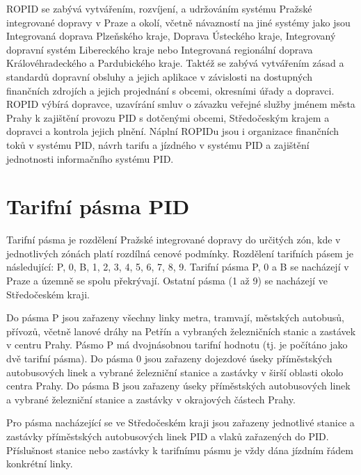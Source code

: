 ROPID se zabývá vytvářením, rozvíjení, a udržováním systému Pražské integrované dopravy v Praze a okolí,
včetně návazností na jiné systémy jako jsou Integrovaná doprava Plzeňského kraje,
Doprava Ústeckého kraje, Integrovaný dopravní systém Libereckého kraje nebo 
Integrovaná regionální doprava Královéhradeckého a Pardubického kraje.
Taktéž se zabývá vytvářením zásad a standardů dopravní obsluhy a jejich aplikace v závislosti
na dostupných finančních zdrojích a jejich projednání s obcemi, okresními úřady a dopravci.
ROPID výbírá dopravce, uzavírání smluv o závazku veřejné služby jménem města Prahy 
k zajištění provozu PID s dotčenými obcemi, Středočeským krajem a dopravci a kontrola jejich plnění.
Náplní ROPIDu jsou i organizace finančních toků v systému PID, návrh tarifu a jízdného v systému PID a
zajištění jednotnosti informačního systému PID.  \cite{wikipedia-ropid}

\section{Tarifní pásma PID}

Tarifní pásma je rozdělení Pražské integrované dopravy do určitých zón, kde v jednotlivých
zónách platí rozdílná cenové podmínky. Rozdělení tarifních pásem je následující:
P, 0, B, 1, 2, 3, 4, 5, 6, 7, 8, 9. Tarifní pásma P, 0 a B se nacházejí v Praze a územně
se spolu překrývají. Ostatní pásma (1 až 9) se nacházejí ve Středočeském kraji.

Do pásma P jsou zařazeny všechny linky metra, tramvají, městských autobusů, přívozů,
včetně lanové dráhy na Petřín a vybraných železničních stanic a zastávek v centru Prahy.
Pásmo P má dvojnásobnou tarifní hodnotu (tj. je počítáno jako dvě tarifní pásma).
Do pásma 0 jsou zařazeny dojezdové úseky příměstských autobusových linek a vybrané
železniční stanice a zastávky v širší oblasti okolo centra Prahy.
Do pásma B jsou zařazeny úseky příměstských autobusových linek a vybrané 
železniční stanice a zastávky v okrajových částech Prahy. 

Pro pásma nacházející se ve Středočeském kraji jsou zařazeny jednotlivé stanice 
a zastávky příměstských autobusových linek PID a vlaků zařazených do PID. 
Příslušnost stanice nebo zastávky k tarifnímu pásmu je vždy dána jízdním řádem konkrétní linky.\cite{pid}


